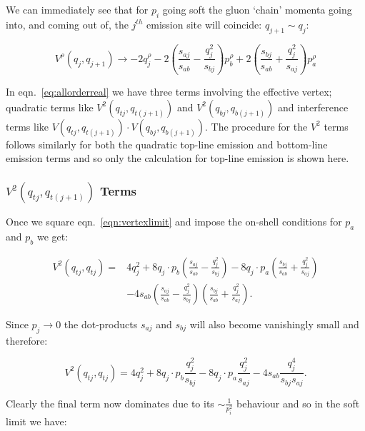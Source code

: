 		We can
		immediately see that for $p_i$ going soft the gluon `chain' momenta going into,
		and coming out of, the $j^{th}$ emission site will coincide: $q_{j+1}\sim q_j$:

		\begin{equation}
			V^\rho(q_j, q_{j+1}) \rightarrow -2q_j^\rho - 2\left(\frac{s_{aj}}{s_{ab}} -
				\frac{q^2_{j}}{s_{bj}}\right)p_b^\rho + 2\left(\frac{s_{bj}}{s_{ab}} +
				\frac{q_j^2}{s_{aj}}\right)p_a^\rho
				\label{eqn:vertexlimit}
		\end{equation}

		In eqn.~\eqref{eq:allorderreal} we have three terms involving the effective vertex;
		quadratic terms like $V^2(q_{tj}, q_{t(j+1)})$ and $V^2(q_{bj}, q_{b(j+1)})$ and interference terms
		like $V(q_{tj}, q_{t(j+1)})\cdot V(q_{bj}, q_{b(j+1)})$.  The procedure for the $V^2$ terms follows
		similarly for both the quadratic top-line emission and bottom-line emission terms and so only
		the calculation for top-line emission is shown here.

		\subsubsection{$V^2(q_{tj}, q_{t(j+1)})$ Terms}

			Once we square eqn.~\eqref{eqn:vertexlimit} and impose the on-shell conditions for
			$p_a$ and $p_b$ we get:

			\begin{align}
				V^2(q_{tj}, q_{tj}) = &4q_j^2 + 8 q_j\cdot p_b \left(\frac{s_{aj}}{s_{ab}} - \frac{q^2_{j}}{s_{bj}}\right) -
					8q_j\cdot p_a \left(\frac{s_{bj}}{s_{ab}} + \frac{q_j^2}{s_{aj}}\right) \\ &- 4s_{ab}\left(\frac{s_{aj}}{s_{ab}} -
					\frac{q^2_{j}}{s_{bj}}\right)\left(\frac{s_{bj}}{s_{ab}} + \frac{q_j^2}{s_{aj}}\right).
			\end{align}

			Since $p_j\rightarrow0$ the dot-products $s_{aj}$ and $s_{bj}$ will also become vanishingly
			small and therefore:

			\begin{equation}
				V^2(q_{tj}, q_{tj}) = 4q_j^2 + 8 q_j\cdot p_b \frac{q^2_{j}}{s_{bj}} - 8 q_j\cdot p_a \frac{q_j^2}{s_{aj}} -
					4s_{ab}\frac{q^4_{j}}{s_{bj}s_{aj}}.
			\end{equation}

			Clearly the final term now dominates due to its $\sim\frac{1}{p_i^2}$ behaviour and so
			in the soft limit we have:

